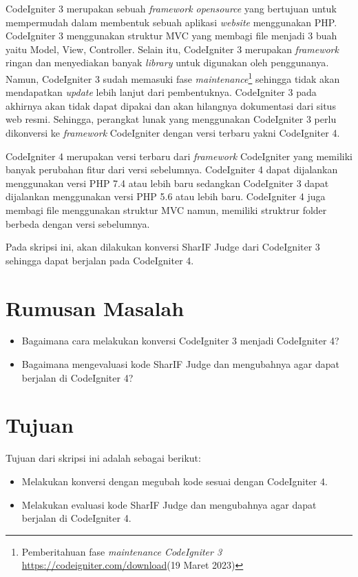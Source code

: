 CodeIgniter 3 merupakan sebuah \textit{framework opensource} yang bertujuan untuk mempermudah dalam membentuk sebuah aplikasi \textit{website} menggunakan PHP. CodeIgniter 3 menggunakan struktur MVC yang membagi file menjadi 3 buah yaitu Model, View, Controller. Selain itu, CodeIgniter 3 merupakan \textit{framework} ringan dan menyediakan banyak \textit{library} untuk digunakan oleh penggunanya\cite{ci3:22}. Namun, CodeIgniter 3 sudah memasuki fase \textit{maintenance}\footnote{Pemberitahuan fase \textit{maintenance CodeIgniter 3} \url{https://codeigniter.com/download}(19 Maret 2023)} sehingga tidak akan mendapatkan \textit{update} lebih lanjut dari pembentuknya. CodeIgniter 3 pada akhirnya akan tidak dapat dipakai dan akan hilangnya dokumentasi dari situs web resmi. Sehingga, perangkat lunak yang menggunakan CodeIgniter 3 perlu dikonversi ke \textit{framework} CodeIgniter dengan versi terbaru yakni CodeIgniter 4.

CodeIgniter 4 merupakan versi terbaru dari \textit{framework} CodeIgniter yang memiliki banyak perubahan fitur dari versi sebelumnya. CodeIgniter 4 dapat dijalankan menggunakan versi PHP 7.4 atau lebih baru sedangkan CodeIgniter 3 dapat dijalankan menggunakan versi PHP 5.6 atau lebih baru. CodeIgniter 4 juga membagi file menggunakan struktur MVC namun, memiliki struktrur folder berbeda dengan versi sebelumnya\cite{codeigniter:23:ci4}.

Pada skripsi ini, akan dilakukan konversi SharIF Judge dari CodeIgniter 3 sehingga dapat berjalan pada CodeIgniter 4.

\section{Rumusan Masalah}
\label{sec:rumusan}
\begin{itemize}
	\item Bagaimana cara melakukan konversi CodeIgniter 3 menjadi CodeIgniter 4?
	\item Bagaimana mengevaluasi kode SharIF Judge dan mengubahnya agar dapat berjalan di CodeIgniter 4?
\end{itemize}
\section{Tujuan}
\label{sec:tujuan}
Tujuan dari skripsi ini adalah sebagai berikut:
\begin{itemize}
	\item Melakukan konversi dengan megubah kode sesuai dengan CodeIgniter 4.
	\item Melakukan evaluasi kode SharIF Judge dan mengubahnya agar dapat berjalan di CodeIgniter 4.
\end{itemize}

